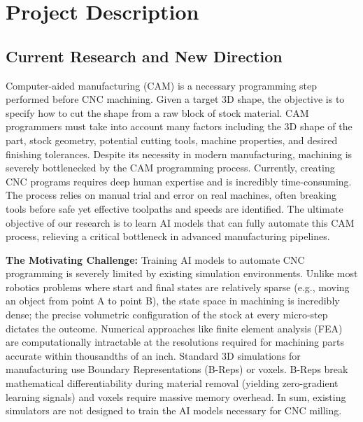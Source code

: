 \documentclass[11pt, letterpaper]{article}
\begin{document}
\section*{Project Description}

\subsection*{Current Research and New Direction}

Computer-aided manufacturing (CAM) is a necessary programming step performed before CNC machining.
Given a target 3D shape, the objective is to specify how to cut the shape from a raw block of stock material.
CAM programmers must take into account many factors including the 3D shape of the part, stock geometry, potential cutting tools, machine properties, and desired finishing tolerances.
Despite its necessity in modern manufacturing, machining is severely bottlenecked by the CAM programming process.
Currently, creating CNC programs requires deep human expertise and is incredibly time-consuming.
The process relies on manual trial and error on real machines, often breaking tools before safe yet effective toolpaths and speeds are identified.
The ultimate objective of our research is to learn AI models that can fully automate this CAM process, relieving a critical bottleneck in advanced manufacturing pipelines.

\textbf{The Motivating Challenge:}
Training AI models to automate CNC programming is severely limited by existing simulation environments.
Unlike most robotics problems where start and final states are relatively sparse (e.g., moving an object from point A to point B), the state space in machining is incredibly dense; the precise volumetric configuration of the stock at every micro-step dictates the outcome.
Numerical approaches like finite element analysis (FEA) are computationally intractable at the resolutions required for machining parts accurate within thousandths of an inch.
Standard 3D simulations for manufacturing use Boundary Representations (B-Reps) or voxels.
B-Reps break mathematical differentiability during material removal (yielding zero-gradient learning signals) and voxels require massive memory overhead.
In sum, existing simulators are not designed to train the AI models necessary for CNC milling.
\end{document}
